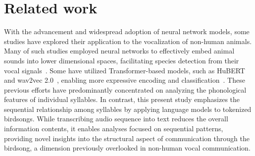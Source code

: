 \section{Related work}
With the advancement and widespread adoption of neural network models, some studies have explored their application to the vocalization of non-human animals. Many of such studies employed neural networks to effectively embed animal sounds into lower dimensional spaces, facilitating species detection from their vocal signals~\cite{14, 15, 16}. Some have utilized Transformer-based models, such as HuBERT~\cite{17} and wav2vec 2.0~\cite{18}, enabling more expressive encoding and classification~\cite{19, 20, 21, 22}. 
These previous efforts have predominantly concentrated on analyzing the phonological features of individual syllables. In contrast, this present study emphasizes the sequential relationship among syllables by applying language models to tokenized birdsongs. While transcribing audio sequence into text reduces the overall information contents, it enables analyses focused on sequential patterns, providing novel insights into the structural aspect of communication through the birdsong, a dimension previously overlooked in non-human vocal communication.